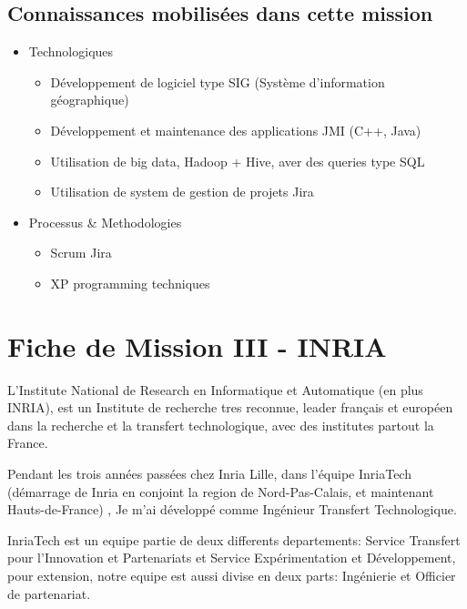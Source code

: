 \documentclass{resume} %
\begin{document}
\subsection {Connaissances mobilisées dans cette mission }


		
	 \begin{itemize}  				
			\item Technologiques 
					 \begin{itemize} 
						\item Développement de logiciel type SIG (Système d'information géographique)
						\item Développement et maintenance des applications JMI (C++, Java) 
						\item Utilisation de big data, Hadoop + Hive, aver des queries type SQL
						\item Utilisation de system de gestion de projets Jira
					\end {itemize}
			\item Processus \& Methodologies 
					 \begin{itemize} 
						\item Scrum Jira
						\item XP programming techniques
					\end {itemize}
		 \end{itemize} 





\section{Fiche de Mission III - INRIA }

	L'Institute National de Research en Informatique et Automatique (en plus INRIA), est un Institute de recherche tres reconnue, leader français et européen dans la recherche et la transfert technologique, avec des institutes partout la France.

         Pendant les trois années passées chez Inria Lille, dans l'équipe InriaTech (démarrage de Inria en conjoint la region de Nord-Pas-Calais, et maintenant Hauts-de-France) ,   Je m'ai développé comme Ingénieur Transfert Technologique. 

    	InriaTech est un equipe partie de deux differents departements: Service Transfert pour l'Innovation et Partenariats et Service Expérimentation et Développement, pour extension, notre equipe est aussi divise en deux parts: Ingénierie et Officier de partenariat.   
\end{document}
